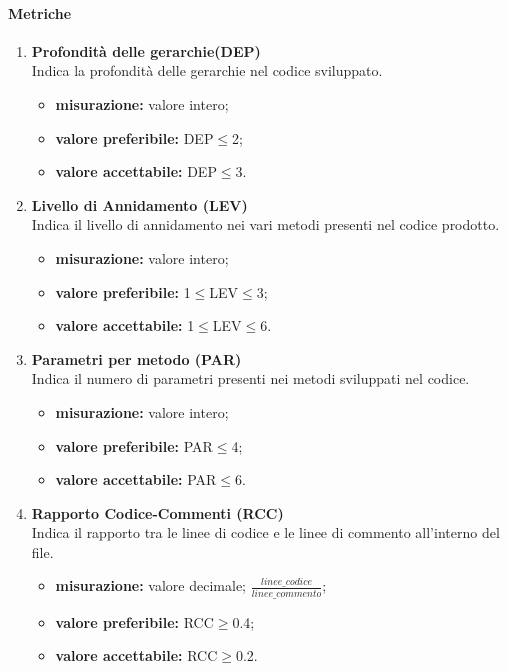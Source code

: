 		\paragraph{Metriche}
		\begin{enumerate}
		\item[]

			\textbf{Profondità delle gerarchie(DEP)}\\
			Indica la profondità delle gerarchie nel codice sviluppato.
			\begin{itemize}
				\item \textbf{misurazione:} valore intero;
				\item \textbf{valore preferibile:} DEP$\leq$2;
				\item \textbf{valore accettabile:} DEP$\leq$3.
			\end{itemize}
\pagebreak
		\item[]
			\textbf{Livello di Annidamento (LEV)}\\
			Indica il livello di annidamento nei vari metodi presenti nel codice prodotto.
			\begin{itemize}
				\item \textbf{misurazione:} valore intero;
				\item \textbf{valore preferibile:} 1$\leq$LEV$\leq$3;
				\item \textbf{valore accettabile:} 1$\leq$LEV$\leq$6.
			\end{itemize}
		\item[]
			\textbf{Parametri per metodo (PAR)}\\
			Indica il numero di parametri presenti nei metodi sviluppati nel codice.
			\begin{itemize}
				\item \textbf{misurazione:} valore intero;
				\item \textbf{valore preferibile:} PAR$\leq$4;
				\item \textbf{valore accettabile:} PAR$\leq$6.
			\end{itemize}
		\item[]
			\textbf{Rapporto Codice-Commenti (RCC)}\\
			Indica il rapporto tra le linee di codice e le linee di commento all'interno del file.
			\begin{itemize}
				\item \textbf{misurazione:} valore decimale; $\frac{linee\_codice}{linee\_commento}$;
				\item \textbf{valore preferibile:} RCC$\geq$0.4;
				\item \textbf{valore accettabile:} RCC$\geq$0.2.
			\end{itemize}
		\end{enumerate}

